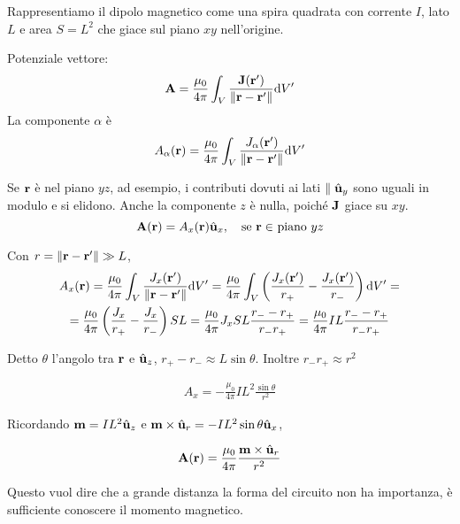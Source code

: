 Rappresentiamo il dipolo magnetico come una spira quadrata con corrente $I$, lato $L$ e area $S = L^2$ che giace sul piano $xy$ nell'origine.

Potenziale vettore:
\begin{equation}
    \mathbf{A} = \frac{\mu_0}{4\pi} \int_V \frac{\mathbf{J}(\mathbf{r}')}{\left\lVert \mathbf{r} - \mathbf{r}' \right\rVert} \mathrm{d} V'
\end{equation}
La componente $\alpha$ è
\begin{equation}
    A_\alpha(\mathbf{r}) = \frac{\mu_0}{4\pi} \int_V \frac{J_\alpha(\mathbf{r}')}{\left\lVert \mathbf{r} - \mathbf{r}' \right\rVert} \mathrm{d} V'
\end{equation}

Se $\mathbf{r}$ è nel piano $yz$, ad esempio, i contributi dovuti ai lati $\parallel \hat{\mathbf{u}}_{y}$ sono uguali in modulo e si elidono.
Anche la componente $z$ è nulla, poiché $\mathbf{J}$ giace su $xy$.
\begin{equation}
    \mathbf{A}(\mathbf{r}) = A_x(\mathbf{r}) \hat{\mathbf{u}}_{x}, \quad \text{se $\mathbf{r} \in$ piano $yz$}
\end{equation}

Con $r = \left\lVert \mathbf{r} - \mathbf{r}' \right\rVert \gg L$,
\begin{equation}
\begin{gathered}
    A_x(\mathbf{r}) = \frac{\mu_0}{4\pi} \int_V \frac{J_x(\mathbf{r}')}{\left\lVert \mathbf{r} - \mathbf{r}' \right\rVert} \mathrm{d} V'
    = \frac{\mu_0}{4\pi} \int_V \left( \frac{J_x(\mathbf{r}')}{r_+} - \frac{J_x(\mathbf{r}')}{r_-} \right) \mathrm{d} V' = \\
    = \frac{\mu_0}{4\pi} \left( \frac{J_x}{r_+} - \frac{J_x}{r_-} \right) SL
    = \frac{\mu_0}{4\pi} J_x S L \frac{r_- - r_+}{r_- r_+}
    = \frac{\mu_0}{4\pi} I L \frac{r_- - r_+}{r_- r_+}
\end{gathered}
\end{equation}

Detto $\theta$ l'angolo tra $\mathbf{r}$ e $\hat{\mathbf{u}}_{z}$, $r_+ - r_- \approx L \sin \theta$.
Inoltre $r_- r_+ \approx r^2$

\begin{gather}
    A_x = -\frac{\mu_0}{4\pi} I L^2 \frac{\sin\theta}{r^2}
\end{gather}

Ricordando $\mathbf{m} = IL^2 \hat{\mathbf{u}}_{z}$ e $\mathbf{m} \times \hat{\mathbf{u}}_{r} = -IL^2 \sin\theta \hat{\mathbf{u}}_{x}$,

\begin{gather}
    \mathbf{A}(\mathbf{r}) = \frac{\mu_0}{4\pi} \frac{\mathbf{m} \times \hat{\mathbf{u}}_{r}}{r^2}
\end{gather}

Questo vuol dire che a grande distanza la forma del circuito non ha importanza, è sufficiente conoscere il momento magnetico.

